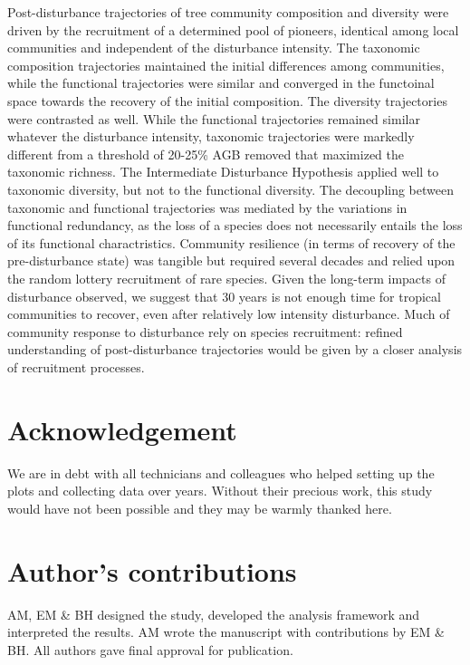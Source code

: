 \documentclass[fleqn,10pt]{ArtEcoFoG} %
\begin{document}
Post-disturbance trajectories of tree community composition and
diversity were driven by the recruitment of a determined pool of
pioneers, identical among local communities and independent of the
disturbance intensity. The taxonomic composition trajectories maintained
the initial differences among communities, while the functional
trajectories were similar and converged in the functoinal space towards
the recovery of the initial composition. The diversity trajectories were
contrasted as well. While the functional trajectories remained similar
whatever the disturbance intensity, taxonomic trajectories were markedly
different from a threshold of 20-25\% AGB removed that maximized the
taxonomic richness. The Intermediate Disturbance Hypothesis applied well
to taxonomic diversity, but not to the functional diversity. The
decoupling between taxonomic and functional trajectories was mediated by
the variations in functional redundancy, as the loss of a species does
not necessarily entails the loss of its functional charactristics.
Community resilience (in terms of recovery of the pre-disturbance state)
was tangible but required several decades and relied upon the random
lottery recruitment of rare species. Given the long-term impacts of
disturbance observed, we suggest that 30 years is not enough time for
tropical communities to recover, even after relatively low intensity
disturbance. Much of community response to disturbance rely on species
recruitment: refined understanding of post-disturbance trajectories
would be given by a closer analysis of recruitment processes.

\section{Acknowledgement}\label{acknowledgement}

We are in debt with all technicians and colleagues who helped setting up
the plots and collecting data over years. Without their precious work,
this study would have not been possible and they may be warmly thanked
here.

\section{Author's contributions}\label{authors-contributions}

AM, EM \& BH designed the study, developed the analysis framework and
interpreted the results. AM wrote the manuscript with contributions by
EM \& BH. All authors gave final approval for publication.
\end{document}
